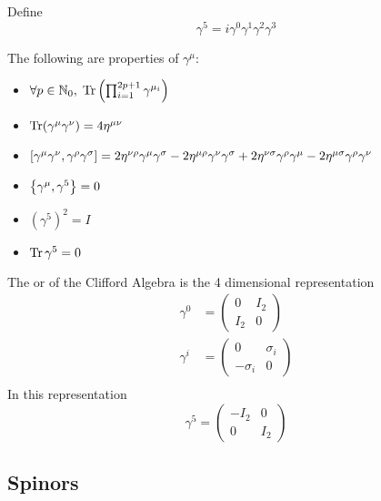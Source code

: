 \documentclass{article}
\begin{document}
\begin{definition}[$\gamma^5$]
Define
\[
\gamma^5 = i \gamma^0 \gamma^1 \gamma^2 \gamma^3
\]
\end{definition}

\begin{theorem}
The following are properties of $\gamma^\mu$:
\begin{itemize}
    \item $\forall p\in\mbb{N}_0, \; \tr \left( \prod _ { i = 1 } ^ { 2 p + 1 } \gamma ^ { \mu _ { i } } \right)$
    \item $\tr(\gamma^\mu \gamma^\nu)=4\eta^{\mu\nu}$
    \item $\comm[\gamma^\mu\gamma^\nu]{\gamma^\rho\gamma^\sigma}=2\eta^{\nu\rho}\gamma^\mu\gamma^\sigma-2\eta^{\mu\rho}\gamma^\nu\gamma^\sigma+2\eta^{\nu\sigma}\gamma^\rho\gamma^\mu-2\eta^{\mu\sigma}\gamma^\rho\gamma^\nu$
    \item $\acomm[\gamma^\mu]{\gamma^5}=0$
    \item $(\gamma^5)^2=I$
    \item $\tr{\gamma^5}=0$
\end{itemize}
\end{theorem}




\begin{definition}
The  or  of the Clifford Algebra is the 4 dimensional representation
\begin{align*}
    \gamma^0 &= \begin{pmatrix} 0 & I_2 \\ I_2 & 0 \end{pmatrix} \\
    \gamma^i &= \begin{pmatrix} 0 & \sigma_i \\ -\sigma_i & 0 \end{pmatrix} \\ 
\end{align*}
In this representation 
\[
\gamma^5=\begin{pmatrix} -I_2 & 0 \\ 0 & I_2 \end{pmatrix}
\]
\end{definition}

\subsection{Spinors}
\end{document}
